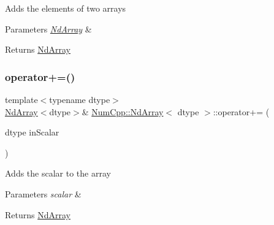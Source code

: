 Adds the elements of two arrays


\begin{DoxyParams}{Parameters}
{\em \mbox{\hyperlink{class_num_cpp_1_1_nd_array}{Nd\+Array}}} & \\
\hline
\end{DoxyParams}
\begin{DoxyReturn}{Returns}
\mbox{\hyperlink{class_num_cpp_1_1_nd_array}{Nd\+Array}} 
\end{DoxyReturn}
\mbox{\label{class_num_cpp_1_1_nd_array_a8a20ee8121408997c375ca1abb84273a}} 
\subsubsection{\texorpdfstring{operator+=()}{operator+=()}\hspace{0.1cm}{\footnotesize\ttfamily [2/2]}}
{\footnotesize\ttfamily template$<$typename dtype$>$ \\
\mbox{\hyperlink{class_num_cpp_1_1_nd_array}{Nd\+Array}}$<$dtype$>$\& \mbox{\hyperlink{class_num_cpp_1_1_nd_array}{Num\+Cpp\+::\+Nd\+Array}}$<$ dtype $>$\+::operator+= (\begin{DoxyParamCaption}\item[{dtype}]{in\+Scalar }\end{DoxyParamCaption})\hspace{0.3cm}{\ttfamily [inline]}}

Adds the scalar to the array


\begin{DoxyParams}{Parameters}
{\em scalar} & \\
\hline
\end{DoxyParams}
\begin{DoxyReturn}{Returns}
\mbox{\hyperlink{class_num_cpp_1_1_nd_array}{Nd\+Array}} 
\end{DoxyReturn}
\mbox{\label{class_num_cpp_1_1_nd_array_abae124e6544458fec2b28685b59d7e3a}} 
